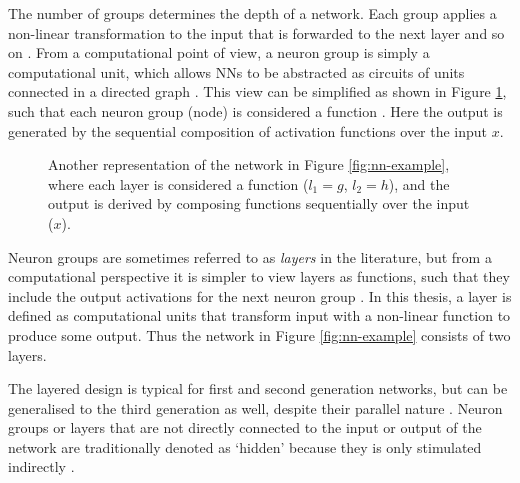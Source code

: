\documentclass[report.tex]{subfiles}
\begin{document}
The number of groups determines the depth of
a network\cite{Russel2007}.
Each group applies a non-linear transformation to the input that is forwarded
to the next layer and so on \cite{Bishop2006, Russel2007}.
From a computational point of view, a neuron group is simply a computational
unit, which allows \glspl{NN} to be abstracted as circuits of units connected in
a directed graph
\cite{Dayan2001, Eliasmith2004, Russel2007}.
This view can be simplified as shown in Figure \ref{fig:nn-composition},
such that each neuron group (node)
is considered a function \cite{Rojas1996}.
Here the output is generated by the sequential
composition of activation functions over the input $x$.
\begin{figure}
\centering
{}
\caption{Another representation of the network in Figure
  \ref{fig:nn-example}, where each layer is considered a function ($l_1 = g$, $l_2 = h$),
and the output is derived by composing functions sequentially 
over the input ($x$).}
\label{fig:nn-composition}
\end{figure}

Neuron groups are sometimes referred to as \textit{layers} 
in the literature, but from a computational perspective it is simpler to view layers as
functions, such that they include the output activations for the next neuron group \cite{Bishop2006}.
In this thesis, a layer is defined as computational units that transform input
with a non-linear function to produce some output.
Thus the network in Figure \ref{fig:nn-example} consists of two layers.

The layered design is typical for first and second generation networks, but 
can be generalised to the third generation as well, despite their parallel
nature \cite{Eliasmith2015}. %
Neuron groups or layers that are not directly connected to the input or output
of the network are traditionally denoted as `hidden' because they is only
stimulated indirectly \cite{Russel2007}.
\end{document}
